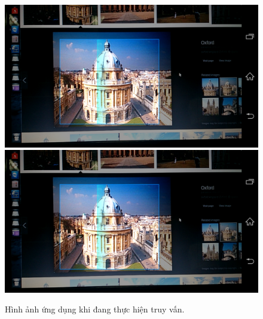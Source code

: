 \begin{figure}[!htbp]
  \begin{center}
    \leavevmode
    \ifpdf
      \includegraphics[scale=0.17]{processing}
    \else
      \includegraphics[scale=0.17]{processing}
    \fi
    \caption[Hình ảnh ứng dụng khi đang thực hiện truy vấn]{Hình ảnh ứng dụng khi đang thực hiện truy vấn.}
    \label{FigProcessing}
  \end{center}
\end{figure}

